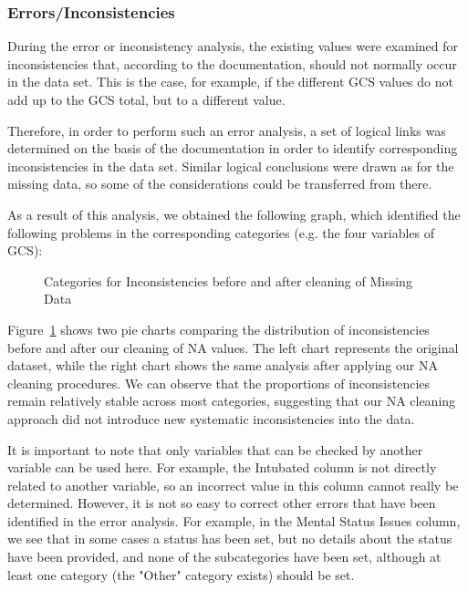 \documentclass[10pt,letterpaper]{article}
\begin{document}
\subsubsection{Errors/Inconsistencies}

During the error or inconsistency analysis, the existing values were examined for inconsistencies that, according to the documentation, should not normally occur in the data set. This is the case, for example, if the different GCS values do not add up to the GCS total, but to a different value.

Therefore, in order to perform such an error analysis, a set of logical links was determined on the basis of the documentation in order to identify corresponding inconsistencies in the data set. Similar logical conclusions were drawn as for the missing data, so some of the considerations could be transferred from there. 

As a result of this analysis, we obtained the following graph, which identified the following problems in the corresponding categories (e.g. the four variables of GCS):

\begin{figure}[H]
    \centering
    \caption{Categories for Inconsistencies before and after cleaning of Missing Data}
    \label{fig:incsonsistencies}
\end{figure}

Figure~\ref{fig:incsonsistencies} shows two pie charts comparing the distribution of inconsistencies before and after our cleaning of NA values. The left chart represents the original dataset, while the right chart shows the same analysis after applying our NA cleaning procedures. We can observe that the proportions of inconsistencies remain relatively stable across most categories, suggesting that our NA cleaning approach did not introduce new systematic inconsistencies into the data.

It is important to note that only variables that can be checked by another variable can be used here. For example, the Intubated column is not directly related to another variable, so an incorrect value in this column cannot really be determined. However, it is not so easy to correct other errors that have been identified in the error analysis. For example, in the Mental Status Issues column, we see that in some cases a status has been set, but no details about the status have been provided, and none of the subcategories have been set, although at least one category (the "Other" category exists) should be set.
\end{document}

